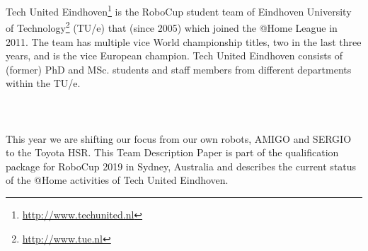 Tech United Eindhoven\footnote{\url{http://www.techunited.nl}} is the RoboCup student team of Eindhoven University of Technology\footnote{\url{http://www.tue.nl}} (TU/e) that (since 2005) which joined the @Home League in 2011. 
The team has multiple vice World championship titles, two in the last three years, and is the vice European champion. 
Tech United Eindhoven consists of (former) PhD and MSc. students and staff members from different departments within the TU/e.
\\\\
\\\\
This year we are shifting our focus from our own robots, AMIGO and SERGIO to the Toyota HSR.
This Team Description Paper is part of the qualification package for RoboCup 2019 in Sydney, Australia and describes the current status of the @Home activities of Tech United Eindhoven.
